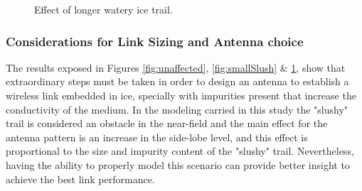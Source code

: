 \begin{figure}[htb]
	\centering
	\caption{Effect of longer watery ice trail.}
	\label{fig:bigSlush}
\end{figure}

\subsubsection{Considerations for Link Sizing and Antenna choice}
The results exposed in Figures \ref{fig:unaffected}, \ref{fig:smallSlush} \& \ref{fig:bigSlush}, show that extraordinary steps must be taken in order to design an antenna to establish a wireless link embedded in ice, specially with impurities present that increase the conductivity of the medium. In the modeling carried in this study the "slushy" trail is considered an obstacle in the near-field and the main effect for the antenna pattern is an increase in the side-lobe level, and this effect is proportional to the size and impurity content of the "slushy" trail. Nevertheless, having the ability to properly model this scenario can provide better insight to achieve the best link performance.

